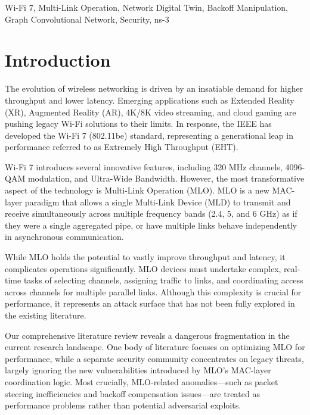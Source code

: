 \documentclass[conference]{IEEEtran}
\begin{document}
\begin{IEEEkeywords}
Wi-Fi 7, Multi-Link Operation, Network Digital Twin, Backoff Manipulation, Graph Convolutional Network, Security, ns-3
\end{IEEEkeywords}

\section{Introduction}
\label{sec:intro}

The evolution of wireless networking is driven by an insatiable demand for higher throughput and lower latency. Emerging applications such as Extended Reality (XR), Augmented Reality (AR), 4K/8K video streaming, and cloud gaming are pushing legacy Wi-Fi solutions to their limits. In response, the IEEE has developed the Wi-Fi 7 (802.11be) standard, representing a generational leap in performance referred to as Extremely High Throughput (EHT).

Wi-Fi 7 introduces several innovative features, including 320 MHz channels, 4096-QAM modulation, and Ultra-Wide Bandwidth. However, the most transformative aspect of the technology is Multi-Link Operation (MLO). MLO is a new MAC-layer paradigm that allows a single Multi-Link Device (MLD) to transmit and receive simultaneously across multiple frequency bands (2.4, 5, and 6 GHz) as if they were a single aggregated pipe, or have multiple links behave independently in asynchronous communication.

While MLO holds the potential to vastly improve throughput and latency, it complicates operations significantly. MLO devices must undertake complex, real-time tasks of selecting channels, assigning traffic to links, and coordinating access across channels for multiple parallel links. Although this complexity is crucial for performance, it represents an attack surface that has not been fully explored in the existing literature.

Our comprehensive literature review reveals a dangerous fragmentation in the current research landscape. One body of literature focuses on optimizing MLO for performance, while a separate security community concentrates on legacy threats, largely ignoring the new vulnerabilities introduced by MLO's MAC-layer coordination logic. Most crucially, MLO-related anomalies---such as packet steering inefficiencies and backoff compensation issues---are treated as performance problems rather than potential adversarial exploits.
\end{document}
